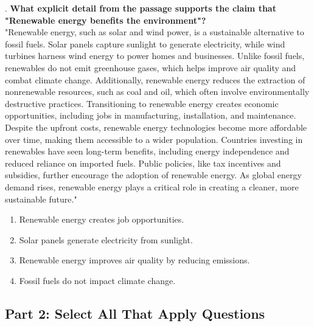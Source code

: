 \documentclass[12pt]{article}
\begin{document}
\vspace{1cm}
. \textbf{What explicit detail from the passage supports the claim that "Renewable energy benefits the environment"?\\}
"Renewable energy, such as solar and wind power, is a sustainable alternative to fossil fuels. Solar panels capture sunlight to generate electricity, while wind turbines harness wind energy to power homes and businesses. Unlike fossil fuels, renewables do not emit greenhouse gases, which helps improve air quality and combat climate change. Additionally, renewable energy reduces the extraction of nonrenewable resources, such as coal and oil, which often involve environmentally \\destructive practices. Transitioning to renewable energy creates economic \\opportunities, including jobs in manufacturing, installation, and maintenance. \\Despite the upfront costs, renewable energy technologies become more affordable over time, making them accessible to a wider population. Countries investing in renewables have seen long-term benefits, including energy independence and \\reduced reliance on imported fuels. Public policies, like tax incentives and subsidies, further encourage the adoption of renewable energy. As global energy demand rises, renewable energy plays a critical role in creating a cleaner, more sustainable future."  
\begin{enumerate}[label=\Alph*.]
    \item Renewable energy creates job opportunities.  
    \item Solar panels generate electricity from sunlight.  
    \item Renewable energy improves air quality by reducing emissions.  
    \item Fossil fuels do not impact climate change.  
\end{enumerate}



\subsection*{Part 2: Select All That Apply Questions}
\end{document}
